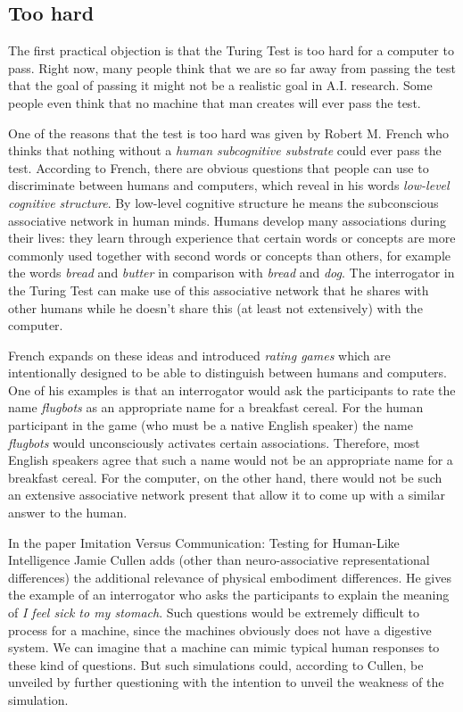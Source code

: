 \subsection{Too hard}
The first practical objection is that the Turing Test is too hard for a computer to pass. Right now, many people think that we are so far away from passing the test that the goal of passing it might not be a realistic goal in A.I. research. Some people even think that no machine that man creates will ever pass the test.

One of the reasons that the test is too hard was given by Robert M. French who thinks that nothing without a \textit{human subcognitive substrate} could ever pass the test. According to French, there are obvious questions that people can use to discriminate between humans and computers, which reveal in his words \textit{low-level cognitive structure}. By low-level cognitive structure he means the subconscious associative network in human minds. Humans develop many associations during their lives: they learn through experience that certain words or concepts are more commonly used together with second words or concepts than others, for example the words \textit{bread} and \textit{butter} in comparison with \textit{bread} and \textit{dog}. The interrogator in the Turing Test can make use of this associative network that he shares with other humans while he doesn't share this (at least not extensively) with the computer.

French expands on these ideas and introduced \textit{rating games} which are intentionally designed to be able to distinguish between humans and computers. One of his examples is that an interrogator would ask the participants to rate the name \textit{flugbots} as an appropriate name for a breakfast cereal. For the human participant in the game (who must be a native English speaker) the name \textit{flugbots} would unconsciously activates certain associations. Therefore, most English speakers agree that such a name would not be an appropriate name for a breakfast cereal. For the computer, on the other hand, there would not be such an extensive associative network present that allow it to come up with a similar answer to the human.

In the paper Imitation Versus Communication: Testing for Human-Like Intelligence Jamie Cullen adds (other than neuro-associative representational differences) the additional relevance of physical embodiment differences. He gives the example of an interrogator who asks the participants to explain the meaning of \textit{I feel sick to my stomach}. Such questions would be extremely difficult to process for a machine, since the machines obviously does not have a digestive system. We can imagine that a machine can mimic typical human responses to these kind of questions. But such simulations could, according to Cullen, be unveiled by further questioning with the intention to unveil the weakness of the simulation.

